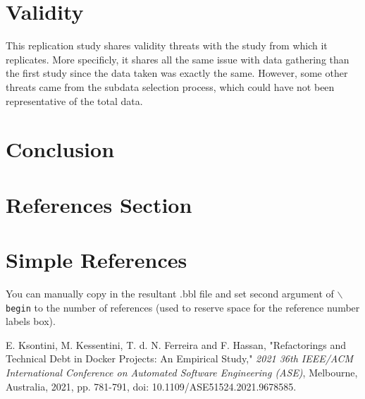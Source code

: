 \documentclass[lettersize,journal]{IEEEtran}
\begin{document}
\section{Validity}

This replication study shares validity threats with the study from \cite{1} which it replicates.
More specificly, it shares all the same issue with data gathering than the first study since the data taken was exactly the same.
However, some other threats came from the subdata selection process, which could have not been representative of the total data.

\section{Conclusion}

\section{References Section}
%
\section{Simple References}
You can manually copy in the resultant .bbl file and set second argument of $\backslash${\tt{begin}} to the number of references
 (used to reserve space for the reference number labels box).

\begin{thebibliography}{1}


E. Ksontini, M. Kessentini, T. d. N. Ferreira and F. Hassan, "Refactorings and Technical Debt in Docker Projects: An Empirical Study," \textit{2021 36th IEEE/ACM International Conference on Automated Software Engineering (ASE)}, Melbourne, Australia, 2021, pp. 781-791, doi: 10.1109/ASE51524.2021.9678585.

\end{thebibliography}

\vfill
\end{document}
